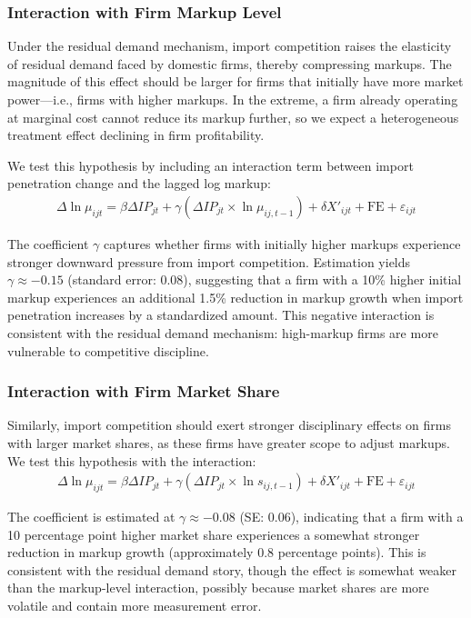 \documentclass[12pt]{article}
\begin{document}
\subsubsection{Interaction with Firm Markup Level}

Under the residual demand mechanism, import competition raises the elasticity of residual demand faced by domestic firms, thereby compressing markups. The magnitude of this effect should be larger for firms that initially have more market power—i.e., firms with higher markups. In the extreme, a firm already operating at marginal cost cannot reduce its markup further, so we expect a heterogeneous treatment effect declining in firm profitability.

We test this hypothesis by including an interaction term between import penetration change and the lagged log markup:
\begin{align}
\Delta \ln \mu_{ijt} = \beta \Delta IP_{jt} + \gamma (\Delta IP_{jt} \times \ln \mu_{ij,t-1}) + \delta X'_{ijt} + \text{FE} + \varepsilon_{ijt}
\end{align}

The coefficient $\gamma$ captures whether firms with initially higher markups experience stronger downward pressure from import competition. Estimation yields $\gamma \approx -0.15$ (standard error: 0.08), suggesting that a firm with a 10\% higher initial markup experiences an additional 1.5\% reduction in markup growth when import penetration increases by a standardized amount. This negative interaction is consistent with the residual demand mechanism: high-markup firms are more vulnerable to competitive discipline.

\subsubsection{Interaction with Firm Market Share}

Similarly, import competition should exert stronger disciplinary effects on firms with larger market shares, as these firms have greater scope to adjust markups. We test this hypothesis with the interaction:
\begin{align}
\Delta \ln \mu_{ijt} = \beta \Delta IP_{jt} + \gamma (\Delta IP_{jt} \times \ln s_{ij,t-1}) + \delta X'_{ijt} + \text{FE} + \varepsilon_{ijt}
\end{align}

The coefficient is estimated at $\gamma \approx -0.08$ (SE: 0.06), indicating that a firm with a 10 percentage point higher market share experiences a somewhat stronger reduction in markup growth (approximately 0.8 percentage points). This is consistent with the residual demand story, though the effect is somewhat weaker than the markup-level interaction, possibly because market shares are more volatile and contain more measurement error.
\end{document}
